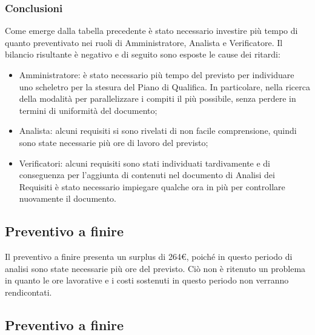 \subsubsection{Conclusioni}
Come emerge dalla tabella precedente è stato necessario investire più tempo di quanto preventivato
nei ruoli di Amministratore, Analista e Verificatore.
Il bilancio risultante è negativo e di seguito sono esposte le cause dei ritardi:
\begin{itemize}
	\item Amministratore: è stato necessario più tempo del previsto per individuare uno scheletro per la stesura del Piano di Qualifica. In particolare,
	nella ricerca della modalità per parallelizzare i compiti il più possibile, senza perdere in termini di uniformità del documento;
	\item Analista: alcuni requisiti si sono rivelati di non facile comprensione, quindi sono state necessarie 
	più ore di lavoro del previsto;
	\item Verificatori: alcuni requisiti sono stati individuati tardivamente e di conseguenza per
	l’aggiunta di contenuti nel documento di Analisi dei Requisiti è stato necessario impiegare
	qualche ora in più per controllare nuovamente il documento.
\end{itemize}
\subsection{Preventivo a finire}
Il preventivo a finire presenta un surplus di 264\euro, poiché in questo periodo di analisi sono state necessarie più ore del previsto.
Ciò non è ritenuto un problema in quanto le ore lavorative e i costi sostenuti in questo periodo non verranno rendicontati.
\subsection{Preventivo a finire}

